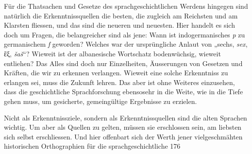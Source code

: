 {Für die  Thatsachen und Gesetze des sprachgeschichtlichen Werdens hingegen sind natürlich die Erkenntnissquellen die besten, die zugleich am Reichsten und am Klarsten fliessen, und das sind die neueren und neuesten. Hier handelt es sich doch um Fragen, die belangreicher sind als jene: Wann ist indogermanisches \textit{p} zu germanischem \textit{f} geworden? Welches war der ursprüngliche Anlaut von „sechs, \textit{sex}, ἓξ, \textit{šaš}“? Wieweit ist der albanesische Wortschatz bodenwüchsig, wieweit entliehen? Das Alles sind doch nur Einzelheiten, Äusserungen von Gesetzen und Kräften, die wir zu erkennen verlangen. Wieweit eine solche Erkenntniss zu erlangen sei, muss die Zukunft lehren. Das aber ist ohne Weiteres einzusehen, dass die geschichtliche Sprachforschung ebensosehr in die Weite, wie in die Tiefe gehen muss, um gesicherte, gemeingültige Ergebnisse zu erzielen.

Nicht als Erkenntnissziele, sondern als Erkenntnissquellen sind die alten Sprachen wichtig. Um aber als Quellen zu gelten, müssen sie erschlossen sein, am liebsten sich selbst erschliessen. Und hier offenbart sich der Werth jener viel\-geschmähten historischen Orthographien für die sprachgeschichtliche  176{\textbar}{\textbar}\label{sp.176}

}
